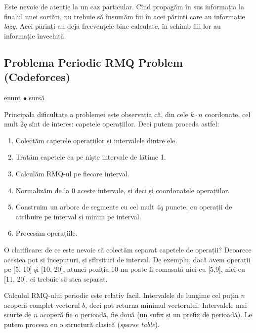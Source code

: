 Este nevoie de atenție la un caz particular. Cînd propagăm în sus informația la finalul unei sortări, nu trebuie să însumăm fiii în acei părinți care au informație \textit{lazy}. Acei părinți au deja frecvențele bine calculate, în schimb fiii lor au informație învechită.

\subsection{Problema Periodic RMQ Problem (Codeforces)}
\label{problem:periodic-rmq-problem}

\href{https://codeforces.com/contest/803/problem/G}{enunț}
$\bullet$
\hyperref[code:periodic-rmq-problem]{sursă}

Principala dificultate a problemei este observația că, din cele $k \cdot n$ coordonate, cel mult $2q$ sînt de interes: capetele operațiilor. Deci putem proceda astfel:

\begin{enumerate}
  \item Colectăm capetele operațiilor și intervalele dintre ele.

  \item Tratăm capetele ca pe niște intervale de lățime 1.

  \item Calculăm RMQ-ul pe fiecare interval.

  \item Normalizăm de la 0 aceste intervale, și deci și coordonatele operațiilor.

  \item Construim un arbore de segmente cu cel mult $4q$ puncte, cu operații de atribuire pe interval și minim pe interval.

  \item Procesăm operațiile.
\end{enumerate}

O clarificare: de ce este nevoie să colectăm separat capetele de operații? Deoarece acestea pot și începuturi, și sfîrșituri de interval. De exemplu, dacă avem operații pe [5, 10] și [10, 20], atunci poziția 10 nu poate fi comasată nici cu [5,9], nici cu [11, 20], ci trebuie să stea separat.

Calculul RMQ-ului periodic este relativ facil. Intervalele de lungime cel puțin $n$ acoperă complet vectorul $b$, deci pot returna minimul vectorului. Intervalele mai scurte de $n$ acoperă fie o perioadă, fie două (un sufix și un prefix de perioadă). Le putem procesa cu o structură clasică (\textit{sparse table}).

